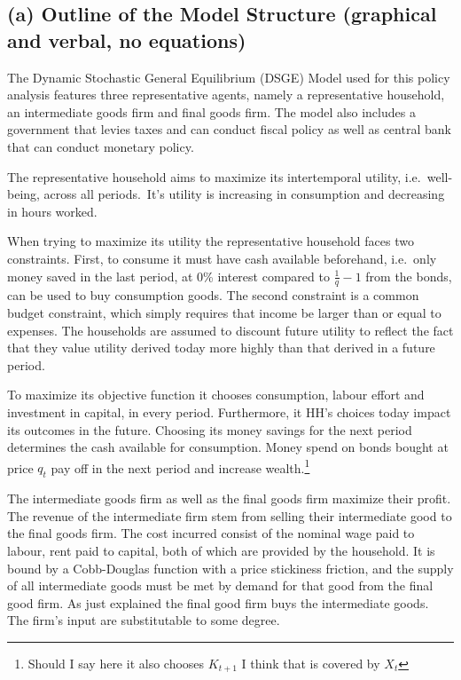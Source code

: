 \documentclass[12pt]{article}
\begin{document}
\subsection*{(a) Outline of the Model Structure (graphical and verbal, no equations)}
The Dynamic Stochastic General Equilibrium (DSGE) Model used for this policy analysis features
three representative agents, namely a representative household, an intermediate goods firm and final goods firm. The model also includes a government that levies taxes and can conduct fiscal policy as well as central bank that can conduct monetary policy. 

The representative household aims to maximize its intertemporal utility, i.e.~well-being, across all periods.\ It's utility is increasing in consumption and decreasing in hours worked. 

When trying to maximize its utility the representative household faces two constraints. First, to consume it must have cash available beforehand, i.e.\ only money saved in the last period, at 0\% interest compared to $\frac{1}{q} -1$ from the bonds, can be used to buy consumption goods. 
The second constraint is a common budget constraint, which simply requires that income be larger than or equal to expenses.  The households are assumed to discount future utility to reflect the fact that they value utility derived today more highly than that derived in a future period.

To maximize its objective function it chooses consumption, labour effort and investment in capital, in every period. %
Furthermore, it HH's choices today impact its outcomes in the future. Choosing its money savings for the next period determines the cash available for consumption. Money spend on bonds bought at price $q_t$ pay off in the next period and increase wealth.\footnote{Should I say here it also chooses $K_{t+1}$ I think that is covered by $X_t$} 

The intermediate goods firm as well as the final goods firm maximize their profit. The revenue of the intermediate firm stem from selling their intermediate good to the final goods firm. The cost incurred consist of the nominal wage paid to labour, rent paid to capital, both of which are provided by the household. It is bound by a Cobb-Douglas function with a price stickiness friction, and the supply of all intermediate goods must be met by demand for that good from the final good firm.  As just explained the final good firm buys the intermediate goods. The firm's input are substitutable to some degree. 
\end{document}

